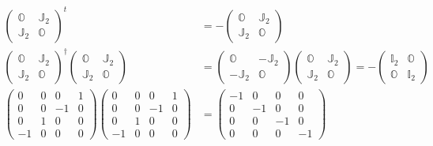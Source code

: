 \documentclass[aps, preprint]{revtex4}
\begin{document}
\begin{align}\left (\begin{array}{cc}\mathbb{O} & \mathbb{J}_{2} \\
\mathbb{J}_{2} & \mathbb{O}\end{array}\right )^{t} &  = -\left (\begin{array}{cc}\mathbb{O} & \mathbb{J}_{2} \\
\mathbb{J}_{2} & \mathbb{O}\end{array}\right ) \\
\left (\begin{array}{cc}\mathbb{O} & \mathbb{J}_{2} \\
\mathbb{J}_{2} & \mathbb{O}\end{array}\right )^{ \dag } \left (\begin{array}{cc}\mathbb{O} & \mathbb{J}_{2} \\
\mathbb{J}_{2} & \mathbb{O}\end{array}\right ) &  =\left (\begin{array}{cc}\mathbb{O} &  -\mathbb{J}_{2} \\
 -\mathbb{J}_{2} & \mathbb{O}\end{array}\right ) \left (\begin{array}{cc}\mathbb{O} & \mathbb{J}_{2} \\
\mathbb{J}_{2} & \mathbb{O}\end{array}\right ) = -\left (\begin{array}{cc}\mathbb{I}_{2} & \mathbb{O} \\
\mathbb{O} & \mathbb{I}_{2}\end{array}\right ) \\
\left (\begin{array}{cccc}0 & 0 & 0 & 1 \\
0 & 0 &  -1 & 0 \\
0 & 1 & 0 & 0 \\
 -1 & 0 & 0 & 0\end{array}\right ) \left (\begin{array}{cccc}0 & 0 & 0 & 1 \\
0 & 0 &  -1 & 0 \\
0 & 1 & 0 & 0 \\
 -1 & 0 & 0 & 0\end{array}\right ) &  =\left (\begin{array}{cccc} -1 & 0 & 0 & 0 \\
0 &  -1 & 0 & 0 \\
0 & 0 &  -1 & 0 \\
0 & 0 & 0 &  -1\end{array}\right )\end{align}
\end{document}

